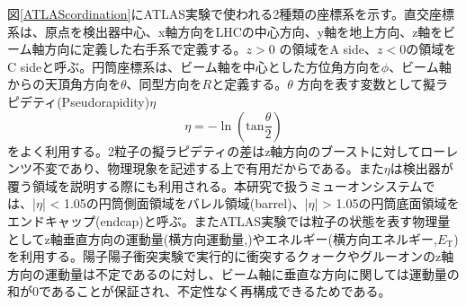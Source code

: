     図\ref{ATLAScordination}にATLAS実験で使われる2種類の座標系を示す。直交座標系は、原点を検出器中心、x軸方向をLHCの中心方向、y軸を地上方向、z軸をビーム軸方向に定義した右手系で定義する。$z>0$ の領域をA side、$z<0$の領域をC sideと呼ぶ。円筒座標系は、ビーム軸を中心とした方位角方向を$\phi$、ビーム軸からの天頂角方向を$\theta$、同型方向を$R$と定義する。$\theta$ 方向を表す変数として擬ラピデティ(Pseudorapidity)$\eta$
    \begin{equation}
        \eta = -\ln(\mathrm{tan}\frac{\theta}{2})
    \end{equation}
    をよく利用する。2粒子の擬ラピデティの差はz軸方向のブーストに対してローレンツ不変であり、物理現象を記述する上で有用だからである。また$\eta$は検出器が覆う領域を説明する際にも利用される。本研究で扱うミューオンシステムでは、|$\eta$| < 1.05の円筒側面領域をバレル領域(barrel)、|$\eta$| > 1.05の円筒底面領域をエンドキャップ(endcap)と呼ぶ。またATLAS実験では粒子の状態を表す物理量としてz軸垂直方向の運動量(横方向運動量,\pt)やエネルギー(横方向エネルギー,$E_{\mathrm{T}}$)を利用する。陽子陽子衝突実験で実行的に衝突するクォークやグルーオンのz軸方向の運動量は不定であるのに対し、ビーム軸に垂直な方向に関しては運動量の和が0であることが保証され、不定性なく再構成できるためである。
